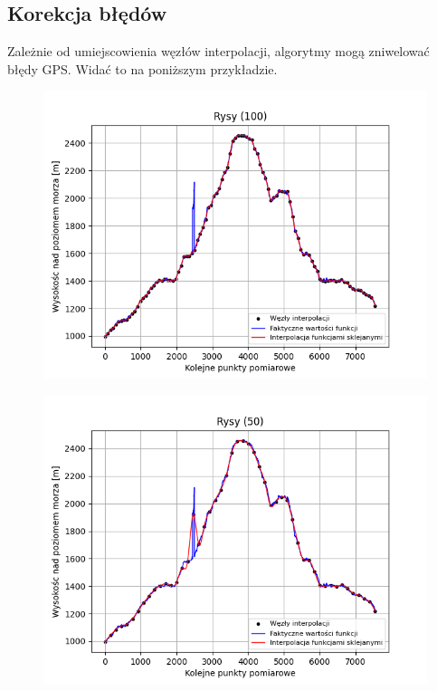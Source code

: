 \documentclass[fleqn]{article}
\begin{document}
\subsection{Korekcja błędów}
    Zależnie od umiejscowienia węzłów interpolacji, algorytmy mogą zniwelować błędy GPS. Widać to na poniższym przykładzie.
    \begin{figure}[h]
      \begin{minipage}{.5\textwidth}
        \centering
        \includegraphics[width=\linewidth]{plot_100_points_Rysy.png}
        \label{fig:test1}
      \end{minipage}%
      \begin{minipage}{.5\textwidth}
        \centering
        \includegraphics[width=\linewidth]{plot_50_points_Rysy.png}
        \label{fig:test2}
      \end{minipage}
    \end{figure}
\end{document}
